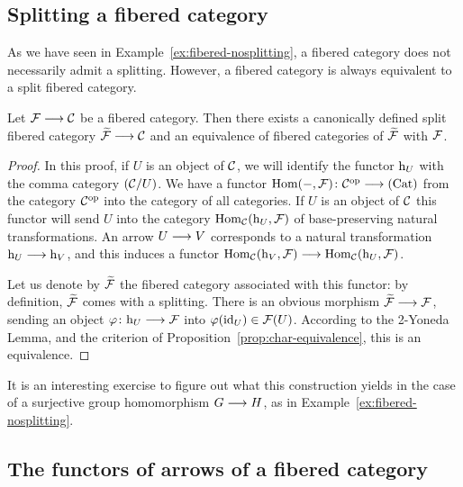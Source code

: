 \begin{3   FIBERED CATEGORIES}
\begin{3.6 Objects as fibcats and the 2-Yoneda}
\subsection{Splitting a fibered category}

As we have seen in Example~\ref{ex:fibered-nosplitting}, a fibered category does not necessarily admit a splitting. However, a fibered category is always equivalent to a split fibered category.

\begin{theorem}\label{thm:equivalent-split}
Let $\cF \arr \cC$ be a fibered category. Then there exists a canonically defined split fibered category $\widetilde{\cF} \arr \cC$ and an equivalence of fibered categories of $\widetilde{\mathcal{F}}$ with $\mathcal{F}$.
\end{theorem}

\begin{proof}
In this proof, if $U$ is an object of $\mathcal{C}$, we will identify the functor $\mathrm{h}_{U}$ with the comma category $(\mathcal{C}/U)$. We have a functor $\hom(-, \cF) \colon \cC\op \arr \cat{Cat}$ from the category $\mathcal{C}^{\mathrm{op}}$ into the category of all categories. If $U$ is an object of $\mathcal{C}$ this functor will send $U$ into the category $\operatorname{Hom}_{\mathcal{C}}(\mathrm{h}_{U}, \mathcal{F})$ of base-preserving natural transformations. An arrow $U \arr V$ corresponds to a natural transformation $\h_{U} \arr \h_{V}$, and this induces a functor $\hom_{\cC}(\h_{V}, \cF) \arr \hom_{\cC}(\h_{U}, \cF)$.

Let us denote by $\widetilde{\mathcal{F}}$ the fibered category associated with this functor: by definition, $\widetilde{\mathcal{F}}$ comes with a splitting. There is an obvious morphism $\widetilde{\cF} \arr \cF$, sending an object $\phi \colon \h_{U} \arr \cF$ into $\varphi(\mathrm{id}_{U}) \in \mathcal{F}(U)$. According to the 2-Yoneda Lemma, and the criterion of Proposition~\ref{prop:char-equivalence}, this is an equivalence.
\end{proof}

It is an interesting exercise to figure out what this construction yields in the case of a surjective group homomorphism $G \arr H$, as in Example~\ref{ex:fibered-nosplitting}.




\end{3.6 Objects as fibcats and the 2-Yoneda}
\begin{3.7 The functors of arrows of a fibcat}
\setcounter{section}{6}
\section{The functors of arrows of a fibered category}
\label{sec:func-arrows}
\setcounter{theorem}{45}


\end{3.7 The functors of arrows of a fibcat}
\end{3   FIBERED CATEGORIES}
